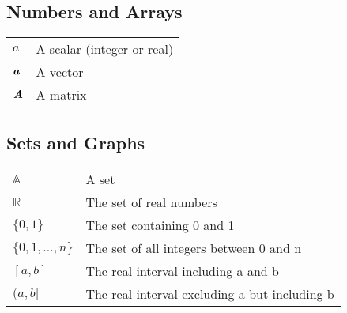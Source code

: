 
\subsection*{Numbers and Arrays}

\begin{tabular}{ll}
  $a$                 & A scalar (integer or real) \\
  $\textbf{\em a}$        & A vector \\
  $\textbf{\em A}$        & A matrix \\
\end{tabular}

\subsection*{Sets and Graphs}

\begin{tabular}{ll}
  $\mathbb{A}$        & A set \\
  $\mathbb{R}$        & The set of real numbers \\
  $\{0, 1\}$          & The set containing 0 and 1 \\
  $\{0,1,\ldots,n\}$  & The set of all integers between 0 and n \\
  $[a, b]$            & The real interval including a and b \\
  $(a, b]$            & The real interval excluding a but including b \\
\end{tabular}



\cleardoublepage
\storeinipagenumber
{}
\setcounter{page}{1}
